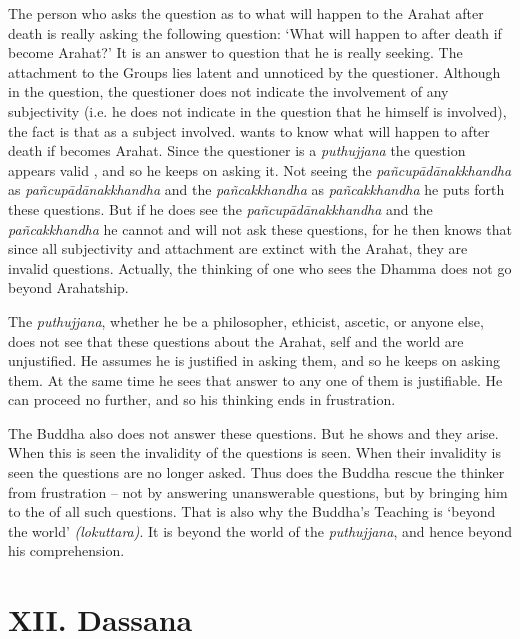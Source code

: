 The person who asks the question as to what will happen to the Arahat after death is really asking the following question: `What will happen to  after death if  become Arahat?' It is an answer to  question that he is really seeking. The attachment to the Groups lies latent and unnoticed by the questioner. Although in the question, the questioner does not indicate the involvement of any subjectivity (i.e. he does not indicate in the question that he himself is involved), the fact is that  as a subject  involved.  wants to know what will happen to  after death if  becomes Arahat. Since the questioner is a \emph{puthujjana} the question appears valid , and so he keeps on asking it. Not seeing the \emph{pañcupādānakkhandha} as \emph{pañcupādānakkhandha} and the \emph{pañcakkhandha} as \emph{pañcakkhandha} he puts forth these questions. But if he does see the \emph{pañcupādānakkhandha} and the \emph{pañcakkhandha} he cannot and will not ask these questions, for he then knows that since all subjectivity and attachment are extinct with the Arahat, they are invalid questions. Actually, the thinking of one who sees the Dhamma does not go beyond Arahatship.

The \emph{puthujjana}, whether he be a philosopher, ethicist, ascetic, or anyone else, does not see that these questions about the Arahat, self and the world are unjustified. He assumes he is justified in asking them, and so he keeps on asking them. At the same time he sees that  answer to any one of them is justifiable. He can proceed no further, and so his thinking ends in frustration.

The Buddha also does not answer these questions. But he shows  and  they arise. When this is seen the invalidity of the questions is seen. When their invalidity is seen the questions are no longer asked. Thus does the Buddha rescue the thinker from frustration -- not by answering unanswerable questions, but by bringing him to the  of all such questions. That is also why the Buddha's Teaching is `beyond the world' \emph{(lokuttara)}. It is beyond the world of the \emph{puthujjana}, and hence beyond his comprehension.

\hypertarget{_xii_dassana}{%
\section{XII. Dassana}\label{_xii_dassana}}

